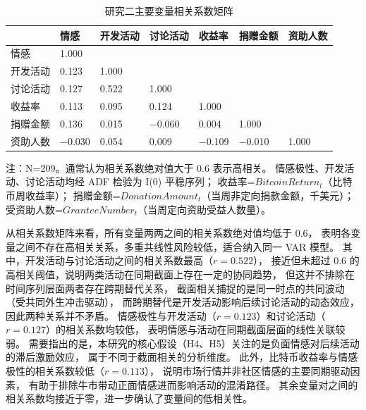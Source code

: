 \documentclass[
    type = master, %
    degree = professional,        %
    decl-page,  %
    twoside,                %
    fontset = fandol %
  ]{njuthesis}
\renewcommand{\footnotesize}{\zihao{-5}}
\begin{document}
\begin{table}[htbp]
    \centering
    \caption{研究二主要变量相关系数矩阵}
    \label{tab:corr-2}
    \small
    \begin{tabularx}{\textwidth}{p{3cm}XXXXXX}
        \toprule
         & 情感 & 开发活动 & 讨论活动 & 收益率 & 捐赠金额 & 资助人数 \\
        \midrule
        情感     & 1.000 & & & & & \\
        开发活动     & 0.123   & 1.000 & & & & \\
        讨论活动     & 0.127   & 0.522 & 1.000 & & & \\
        收益率       & 0.113   & 0.095 & 0.124 & 1.000 & & \\
        捐赠金额     & 0.136   & 0.015 & $-$0.060 & 0.004 & 1.000 & \\
        资助人数   & $-$0.030 & 0.054 & 0.009 & $-$0.109 & $-$0.010 & 1.000 \\
        \bottomrule
    \end{tabularx}
    \begin{minipage}{\textwidth}
        \vspace{0.3em}
        \footnotesize 注：N=209。通常认为相关系数绝对值大于 0.6 表示高相关。
        情感极性、开发活动、讨论活动均经 ADF 检验为 I(0) 平稳序列；
        收益率=$\mathit{BitcoinReturn}_t$（比特币周收益率）；
        捐赠金额=$\mathit{DonationAmount}_t$（当周非定向捐款金额，千美元）；
        受资助人数=$\mathit{GranteeNumber}_t$（当周定向资助受益人数量）。
    \end{minipage}
\end{table}

从相关系数矩阵来看，所有变量两两之间的相关系数绝对值均低于 0.6，
表明各变量之间不存在高相关关系，多重共线性风险较低，适合纳入同一 VAR 模型。
其中，开发活动与讨论活动之间的相关系数最高（$r = 0.522$），
接近但未超过 0.6 的高相关阈值，说明两类活动在同期截面上存在一定的协同趋势，
但这并不排除在时间序列层面两者存在跨期替代关系，
截面相关捕捉的是同一时点的共同波动（受共同外生冲击驱动），
而跨期替代是开发活动影响后续讨论活动的动态效应，因此两种关系并不矛盾。
情感极性与开发活动（$r = 0.123$）和讨论活动（$r = 0.127$）的相关系数均较低，
表明情感与活动在同期截面层面的线性关联较弱。
需要指出的是，本研究的核心假设（H4、H5）关注的是负面情感对后续活动的滞后激励效应，
属于不同于截面相关的分析维度。
此外，比特币收益率与情感极性的相关系数较低（$r = 0.113$），
说明市场行情并非社区情感的主要同期驱动因素，
有助于排除牛市带动正面情感进而影响活动的混淆路径。
其余变量对之间的相关系数均接近于零，进一步确认了变量间的低相关性。
\end{document}
